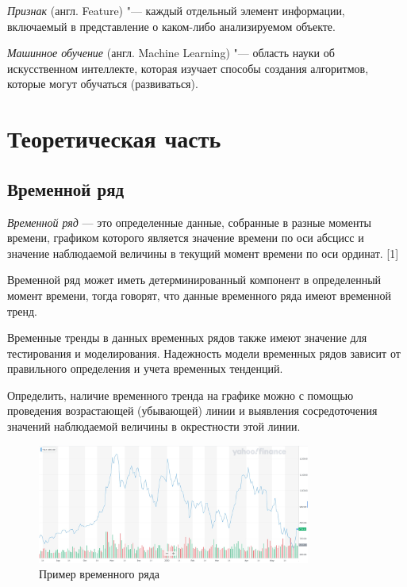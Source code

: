 \documentclass[bachelor, och, coursework]{SCWorks}
\begin{document}
    \textit{Признак} (англ. Feature) "--- каждый отдельный элемент информации,
    включаемый в представление о каком-либо анализируемом объекте.

    \textit{Машинное обучение} (англ. Machine Learning) "--- область науки об
    искусственном интеллекте, которая изучает способы создания алгоритмов,
    которые могут обучаться (развиваться).


\section{Теоретическая часть}

    \subsection{Временной ряд}

        \textit{Временной ряд} — это определенные данные, собранные в разные
        моменты времени, графиком которого является значение времени по оси
        абсцисс и значение наблюдаемой величины в текущий момент времени по оси
        ординат. [1]

        Временной ряд может иметь детерминированный компонент в определенный
        момент времени, тогда говорят, что данные временного ряда имеют
        временной тренд.
    
        Временные тренды в данных временных рядов также имеют значение для
        тестирования и моделирования. Надежность модели временных рядов зависит
        от правильного определения и учета временных тенденций.
    
        Определить, наличие временного тренда на графике можно с помощью
        проведения возрастающей (убывающей) линии и выявления сосредоточения
        значений наблюдаемой величины в окрестности этой линии.

        \begin{figure}[H]
            \centering
            \includegraphics[width=0.8\textwidth]{pic/timeseries.jpg}
            \caption{Пример временного ряда}
        \end{figure}
\end{document}
